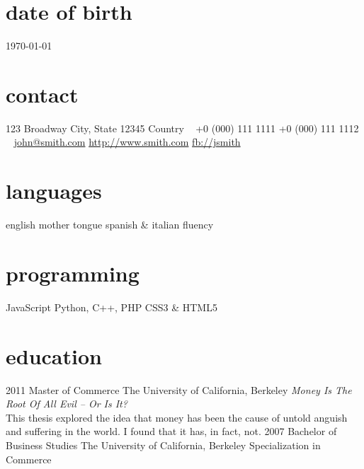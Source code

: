 \documentclass[]{k-cv} %
\begin{document}


\begin{aside} %
\section{date of birth}
\color{gray}1970-01-01
\section{contact}
123 Broadway
City, State 12345
Country
~
+0 (000) 111 1111
+0 (000) 111 1112
~
\href{mailto:john@smith.com}{john@smith.com}
\href{http://www.smith.com}{http://www.smith.com}
\href{http://facebook.com/johnsmith}{fb://jsmith}
\section{languages}
english mother tongue
spanish \& italian fluency
\section{programming}
JavaScript
Python, C++, PHP
CSS3 \& HTML5
\end{aside}


\section{education}

\begin{entrylist}
\entry
{2011 }
{Master {\normalfont of Commerce}}
{The University of California, Berkeley}
{\emph{Money Is The Root Of All Evil -- Or Is It?} \\ This thesis explored the 
idea that money has been the cause of untold anguish and suffering in the world. 
I found that it has, in fact, not.}
\entry
{2007 }
{Bachelor {\normalfont of Business Studies}}
{The University of California, Berkeley}
{Specialization in Commerce}
\end{entrylist}
\end{document}
